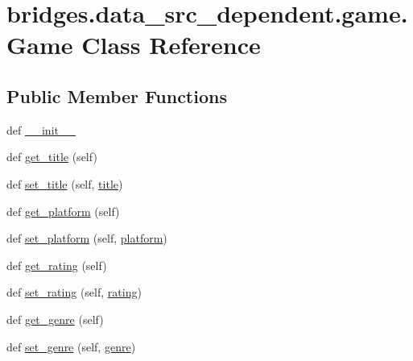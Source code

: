 \hypertarget{classbridges_1_1data__src__dependent_1_1game_1_1_game}{}\section{bridges.\+data\+\_\+src\+\_\+dependent.\+game.\+Game Class Reference}
\label{classbridges_1_1data__src__dependent_1_1game_1_1_game}
\subsection*{Public Member Functions}
\begin{DoxyCompactItemize}
\item 
def \mbox{\hyperlink{classbridges_1_1data__src__dependent_1_1game_1_1_game_aeeaed2287f616f6ec9ff8c2bd6f07835}{\+\_\+\+\_\+init\+\_\+\+\_\+}}
\item 
def \mbox{\hyperlink{classbridges_1_1data__src__dependent_1_1game_1_1_game_a5aa696eb363313d5e29b85c1ee267ddf}{get\+\_\+title}} (self)
\item 
def \mbox{\hyperlink{classbridges_1_1data__src__dependent_1_1game_1_1_game_a5a769e16de3b9b14f55e36afe9eaccc6}{set\+\_\+title}} (self, \mbox{\hyperlink{classbridges_1_1data__src__dependent_1_1game_1_1_game_aed1f4f6133e9638c6919badd5628a6e5}{title}})
\item 
def \mbox{\hyperlink{classbridges_1_1data__src__dependent_1_1game_1_1_game_aaaf4e384480ea74adb776f85107aa94e}{get\+\_\+platform}} (self)
\item 
def \mbox{\hyperlink{classbridges_1_1data__src__dependent_1_1game_1_1_game_a26c0498063639bd079fa6733c9e214b0}{set\+\_\+platform}} (self, \mbox{\hyperlink{classbridges_1_1data__src__dependent_1_1game_1_1_game_aee5c30d2e5a1230b082a8e1bbfc5e52d}{platform}})
\item 
def \mbox{\hyperlink{classbridges_1_1data__src__dependent_1_1game_1_1_game_a6c3b818d8529620a1eac00a4eaccb5bf}{get\+\_\+rating}} (self)
\item 
def \mbox{\hyperlink{classbridges_1_1data__src__dependent_1_1game_1_1_game_a48b4b4257739d49dfb6c106166022713}{set\+\_\+rating}} (self, \mbox{\hyperlink{classbridges_1_1data__src__dependent_1_1game_1_1_game_a7c9febad3d81e1c212fcc94412edc0aa}{rating}})
\item 
def \mbox{\hyperlink{classbridges_1_1data__src__dependent_1_1game_1_1_game_a4f9e6fb999910d12f6bf195230e1f6aa}{get\+\_\+genre}} (self)
\item 
def \mbox{\hyperlink{classbridges_1_1data__src__dependent_1_1game_1_1_game_a139dc6a1d5f255c0544fd1434ccfdadb}{set\+\_\+genre}} (self, \mbox{\hyperlink{classbridges_1_1data__src__dependent_1_1game_1_1_game_a1885fb374c987fae3500f1b1eac19997}{genre}})
\end{DoxyCompactItemize}
